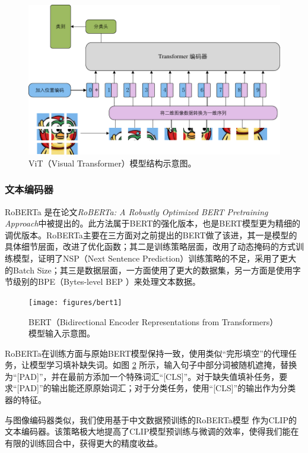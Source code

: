\documentclass[a4paper]{zreport}
\begin{document}
\begin{figure}[h]
\centering
\includegraphics[width=0.9\linewidth]{figures/vit}
\caption{ViT（Visual Transformer）模型结构示意图。}
\label{fig:vit}
\end{figure}

\subsubsection{文本编码器}

RoBERTa \cite{roberta} 是在论文\emph{RoBERTa: A Robustly Optimized BERT Pretraining Approach}中被提出的。此方法属于BERT的强化版本，也是BERT模型更为精细的调优版本。RoBERTa主要在三方面对之前提出的BERT做了该进，其一是模型的具体细节层面，改进了优化函数；其二是训练策略层面，改用了动态掩码的方式训练模型，证明了NSP（Next Sentence Prediction）训练策略的不足，采用了更大的Batch Size；其三是数据层面，一方面使用了更大的数据集，另一方面是使用字节级别的BPE（Bytes-level BEP ）来处理文本数据。

\begin{figure}[h]
\centering
\texttt{[image: figures/bert1]}
\caption{BERT（Bidirectional Encoder Representations from Transformers）模型输入示意图。}
\label{fig:bert1}
\end{figure}

RoBERTa在训练方面与原始BERT模型保持一致，使用类似“完形填空”的代理任务，让模型学习填补缺失词。如图 \ref{fig:bert1} 所示，输入句子中部分词被随机遮掩，替换为“[PAD]”，并在最前方添加一个特殊词汇“[CLS]”。对于缺失值填补任务，要求“[PAD]”的输出能还原原始词汇；对于分类任务，使用“[CLS]”的输出作为分类器的特征。

与图像编码器类似，我们使用基于中文数据预训练的RoBERTa模型 \cite{cn-roberta} 作为CLIP的文本编码器。该策略极大地提高了CLIP模型预训练与微调的效率，使得我们能在有限的训练回合中，获得更大的精度收益。
\end{document}
